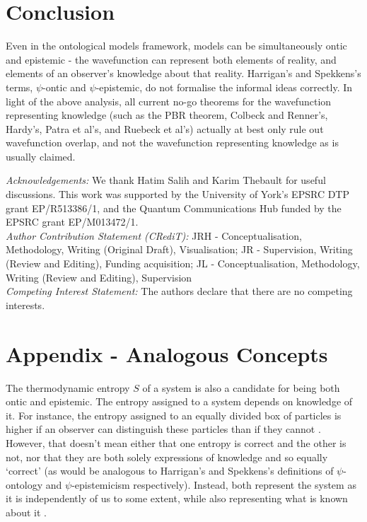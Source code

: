 \documentclass[superscriptaddress,reprint, floatfix, prl,nofootinbib]{revtex4-2}
\begin{document}
\section{Conclusion}

Even in the ontological models framework, models can be simultaneously ontic and epistemic - the wavefunction can represent both elements of reality, and elements of an observer's knowledge about that reality. Harrigan's and Spekkens's terms, $\psi$-ontic and $\psi$-epistemic, do not formalise the informal ideas correctly. In light of the above analysis, all current no-go theorems for the wavefunction representing knowledge (such as the PBR theorem, Colbeck and Renner's, Hardy's, Patra et al's, and Ruebeck  et al's) actually at best only rule out wavefunction overlap, and not the wavefunction representing knowledge as is usually claimed.

\begin{acknowledgements} \textit{Acknowledgements:} We thank Hatim Salih and Karim Thebault for useful discussions. This work was supported by the University of York's EPSRC DTP grant EP/R513386/1, and the Quantum Communications Hub funded by the EPSRC grant EP/M013472/1.\\
\textit{Author Contribution Statement (CRediT):} JRH - Conceptualisation, Methodology, Writing (Original Draft), Visualisation; JR - Supervision, Writing (Review and Editing), Funding acquisition; JL - Conceptualisation, Methodology, Writing (Review and Editing), Supervision\\
\textit{Competing Interest Statement:} The authors declare that there are no competing interests.
\end{acknowledgements}




\appendix
\section{Appendix - Analogous Concepts}
The thermodynamic entropy $S$ of a system is also a candidate for being both ontic and epistemic. The entropy assigned to a system depends on knowledge of it. For instance, the entropy assigned to an equally divided box of particles is higher if an observer can distinguish these particles than if they cannot \cite{Cheng2009Thermodynamics}. However, that doesn't mean either that one entropy is correct and the other is not, nor that they are both solely expressions of knowledge and so equally `correct' (as would be analogous to Harrigan's and Spekkens's definitions of $\psi$-ontology and $\psi$-epistemicism respectively). Instead, both represent the system as it is independently of us to some extent, while also representing what is known about it \cite{Ladyman2008UseofITEntropy}.
\end{document}
